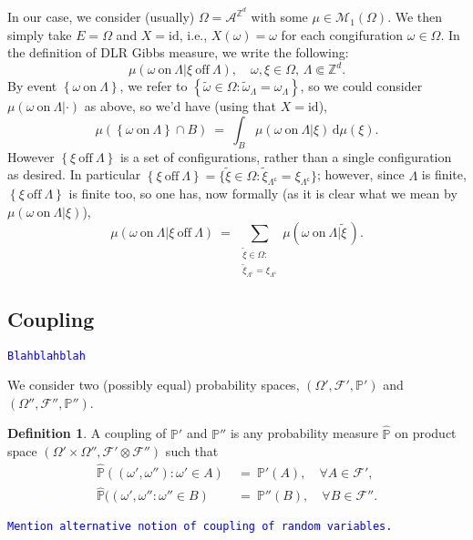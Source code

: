 \documentclass[12pt]{article}
\newcommand{\A}{\mathcal{A}}
\renewcommand{\d}{\mathrm{d}}
\newcommand{\F}{\mathcal{F}}
\newcommand{\M}{\mathcal{M}}
\renewcommand{\P}{\mathbb{P}}
\newcommand{\Z}{\mathbb{Z}}
\newcommand{\set}[1]{\left\{#1\right\}}
\newcommand{\pika}{\boldsymbol{\cdot}}
\newcommand{\1}{\mathbbm{1}}
\renewcommand{\c}{\mathsf{c}}
\newcommand{\5}{\vspace{0.5cm}}
\renewcommand{\tilde}{\widetilde}
\renewcommand{\hat}{\widehat}
\theoremstyle{definition}
\newtheorem{df}[thm]{Definition}
\begin{document}
In our case, we consider (usually) $\Omega=\A^{\Z^d}$ with some $\mu\in\M_1(\Omega)$. We then simply take $E=\Omega$ and $X=\mathrm{id}$, i.e., $X(\omega)=\omega$ for each congifuration $\omega\in\Omega$. In the definition of DLR Gibbs measure, we write the following:
$$\mu(\omega~\text{on}~\Lambda|\xi~\text{off}~\Lambda),\quad \omega,\xi\in\Omega,\,\Lambda\Subset\Z^d.$$
By event $\set{\omega~\text{on}~\Lambda}$, we refer to $\set{\tilde{\omega}\in\Omega:\tilde{\omega}_\Lambda=\omega_\Lambda}$, so we could consider $\mu(\omega~\text{on}~\Lambda|\pika)$ as above, so we'd have (using that $X=\mathrm{id}$),
$$\mu(\set{\omega~\text{on}~\Lambda}\cap B) ~=~ \int_B \mu(\omega~\text{on}~\Lambda|\xi)\,\d\mu(\xi).$$
However $\set{\xi~\text{off}~\Lambda}$ is a set of configurations, rather than a single configuration as desired. In particular $\set{\xi~\text{off}~\Lambda}=\{\tilde{\xi}\in\Omega:\tilde{\xi}_{\Lambda^\c}=\xi_{\Lambda^\c}\}$; however, since $\Lambda$ is finite, $\set{\xi~\text{off}~\Lambda}$ is finite too, so one has, now formally (as it is clear what we mean by $\mu(\omega~\text{on}~\Lambda|\xi)$),
$$\mu(\omega~\text{on}~\Lambda|\xi~\text{off}~\Lambda) ~=~ \sum_{\substack{\tilde{\xi}\in\Omega:\\\tilde{\xi}_{\Lambda^\c}=\xi_{\Lambda^\c}}}\mu(\omega~\text{on}~\Lambda|\tilde{\xi}\,).$$ 


\subsection{Coupling}

\textcolor{blue}{\texttt{Blahblahblah}} %

We consider two (possibly equal) probability spaces, $(\Omega',\F',\P')$ and $(\Omega'',\F'',\P'')$.

\begin{df}
A coupling of $\P'$ and $\P''$ is any probability measure $\hat{\P}$ on product space $(\Omega'\times\Omega'',\F'\otimes\F'')$ such that 
\begin{align*}
\hat{\P}((\omega',\omega''):\omega'\in A) ~&=~ \P'(A), \quad \forall A\in\F', \\
\hat{\P}((\omega',\omega'':\omega''\in B) ~&=~ \P''(B), \quad \forall B\in\F''.
\end{align*}
\end{df}

\textcolor{blue}{\texttt{Mention alternative notion of coupling of random variables.}}
\end{document}
